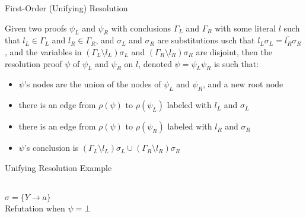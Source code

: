 \begin{frame}{First-Order (Unifying) Resolution}
\begin{definition}
Given two proofs $\psi_L$ and $\psi_R$ with conclusions $\Gamma_L$ and $\Gamma_R$ with some literal $l$ such that $l_L\in \Gamma_L$ and $l_R\in \Gamma_R$, and $\sigma_L$ and $\sigma_R$ are substitutions usch that $l_L\sigma_L=\overline{l_R}\sigma_R$, and the variables in $(\Gamma_L\setminus l_L)\sigma_L$ and $(\Gamma_R\setminus l_R)\sigma_R$ are disjoint, then the resolution proof $\psi$ of $\psi_L$ and $\psi_R$ on $l$, denoted $\psi=\psi_L \psi_R$ is such that:
\begin{itemize}
\item $\psi$'s nodes are the union of the nodes of $\psi_L$ and $\psi_R$, and a new root node
\item there is an edge from $\rho(\psi)$ to $\rho(\psi_L)$ labeled with $l_L$ and $\sigma_L$
\item there is an edge from $\rho(\psi)$ to $\rho(\psi_R)$ labeled with $l_R$ and $\sigma_R$
\item $\psi$'s conclusion is $(\Gamma_L\setminus l_L)\sigma_L\cup (\Gamma_R\setminus l_R)\sigma_R$
\end{itemize}
\end{definition}
\end{frame}

\begin{frame}{Unifying Resolution Example}
\begin{center}
      \\\vspace{1cm}
 $\sigma = \{Y\rightarrow a\}$\\
 Refutation when $\psi=\bot$
 \end{center}
\end{frame}



